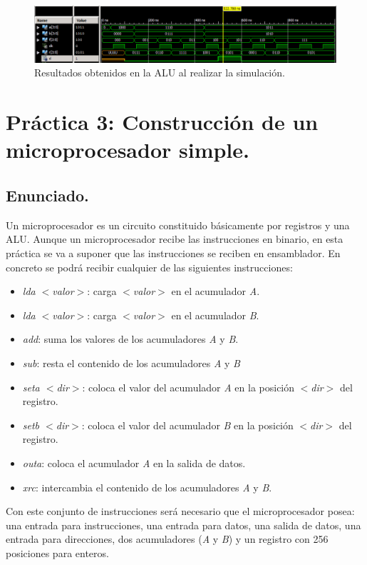 \documentclass{article}
\begin{document}
\begin{figure}[h]
  \centering
    \includegraphics[width=1\textwidth]{img/p2_tb.png}
  \caption{Resultados obtenidos en la ALU al realizar la simulación.}
  \label{fig:p2:tb}
\end{figure}

\section{Práctica 3: Construcción de un microprocesador simple.}

\subsection{Enunciado.}

Un microprocesador es un circuito constituido básicamente por registros y una ALU. Aunque un microprocesador recibe las instrucciones en binario, en esta práctica se va a suponer que las instrucciones se reciben en ensamblador. En concreto se podrá recibir cualquier de las siguientes instrucciones:
\begin{itemize}
	\item \emph{lda $<$valor$>$}: carga \emph{$<$valor$>$} en el acumulador \emph{A}.
	\item \emph{lda $<$valor$>$}: carga \emph{$<$valor$>$} en el acumulador \emph{B}.
	\item \emph{add}: suma los valores de los acumuladores \emph{A} y \emph{B}.
	\item \emph{sub}: resta el contenido de los acumuladores \emph{A} y \emph{B}
	\item \emph{seta $<$dir$>$}: coloca el valor del acumulador \emph{A} en la posición \emph{$<$dir$>$} del registro.
	\item \emph{setb $<$dir$>$}: coloca el valor del acumulador \emph{B} en la posición \emph{$<$dir$>$} del registro.
	\item \emph{outa}: coloca el acumulador \emph{A} en la salida de datos.
	\item \emph{xrc}: intercambia el contenido de los acumuladores \emph{A} y \emph{B}.
\end{itemize}

Con este conjunto de instrucciones será necesario que el microprocesador posea: una entrada para instrucciones, una entrada para datos, una salida de datos, una entrada para direcciones, dos acumuladores (\emph{A} y \emph{B}) y un registro con 256 posiciones para enteros.
\end{document}

